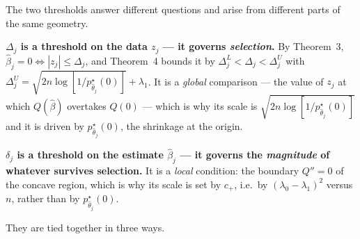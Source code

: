 \documentclass[11pt]{article}
\newcommand{\bhat}{\widehat{\beta}}
\newcommand{\pstar}{p^{\star}}
\newcommand{\thetahat}{\widehat{\theta}}
\newcommand{\lamdiff}{(\lambda_0-\lambda_1)}
\begin{document}
The two thresholds answer different questions and arise from different parts of
the same geometry.

\medskip
\noindent\textbf{$\Delta_j$ is a threshold on the data $z_j$ --- it governs
\emph{selection}.} By Theorem~3, $\bhat_j = 0 \iff |z_j|\le\Delta_j$, and
Theorem~4 bounds it by $\Delta_j^L < \Delta_j < \Delta_j^U$ with
$\Delta_j^U = \sqrt{2n\log[1/\pstar_{\thetahat_j}(0)]} + \lambda_1$. It is a
\emph{global} comparison --- the value of $z_j$ at which $Q(\bhat)$ overtakes
$Q(0)$ --- which is why its scale is $\sqrt{2n\log[1/\pstar_{\thetahat_j}(0)]}$
and it is driven by $\pstar_{\thetahat_j}(0)$, the shrinkage at the origin.

\medskip
\noindent\textbf{$\delta_j$ is a threshold on the estimate $\bhat_j$ --- it
governs the \emph{magnitude} of whatever survives selection.} It is a
\emph{local} condition: the boundary $Q''=0$ of the concave region, which is why
its scale is set by $c_+$, i.e.\ by $\lamdiff^2$ versus $n$, rather than by
$\pstar_{\thetahat_j}(0)$.

\medskip
They are tied together in three ways.
\end{document}
